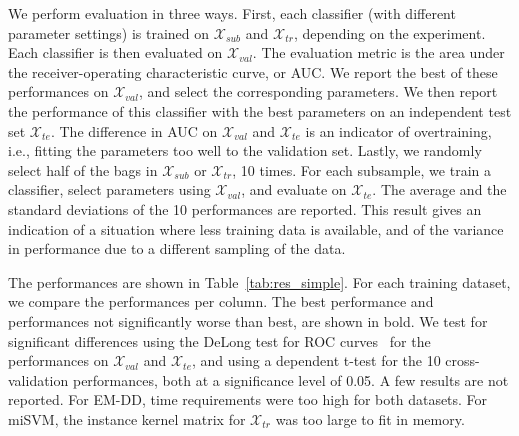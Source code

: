 \documentclass[10pt,conference,a4paper]{IEEEtran}
\begin{document}
We perform evaluation in three ways. First, each classifier (with different parameter settings) is trained on $\mathcal{X}_{sub}$ and $\mathcal{X}_{tr}$, depending on the experiment. Each classifier is then evaluated on $\mathcal{X}_{val}$. The evaluation metric is the area under the receiver-operating characteristic curve, or AUC. We report the best of these performances on $\mathcal{X}_{val}$, and select the corresponding parameters. We then report the performance of this classifier with the best parameters on an independent test set $\mathcal{X}_{te}$. The difference in AUC on $\mathcal{X}_{val}$ and $\mathcal{X}_{te}$ is an indicator of overtraining, i.e., fitting the parameters too well to the validation set. Lastly, we randomly select half of the bags in $\mathcal{X}_{sub}$ or $\mathcal{X}_{tr}$, 10 times. For each subsample, we train a classifier, select parameters using $\mathcal{X}_{val}$, and evaluate on $\mathcal{X}_{te}$. The average and the standard deviations of the 10 performances are reported. This result gives an indication of a situation where less training data is available, and of the variance in performance due to a different sampling of the data.

The performances are shown in Table~\ref{tab:res_simple}. For each training dataset, we compare the performances per column. The best performance and performances not significantly worse than best, are shown in bold. We test for significant differences using the DeLong test for ROC curves~\cite{delong1988comparing} for the performances on $\mathcal{X}_{val}$ and $\mathcal{X}_{te}$, and using a dependent t-test for the 10 cross-validation performances, both at a significance level of 0.05. A few results are not reported. For EM-DD, time requirements were too high for both datasets. For miSVM, the instance kernel matrix for $\mathcal{X}_{tr}$ was too large to fit in memory.
\end{document}
